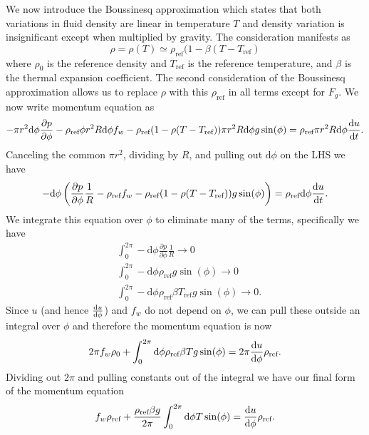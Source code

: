 \documentclass[12pt]{report}
\newcommand{\pdiff}[2]{\frac{\partial #1}{\partial #2}}
\newcommand{\diff}[2]{\frac{{\rm d}#1}{{\rm d}#2}}
\newcommand{\rhoref}{\rho_{\text{ref}}}
\newcommand{\dphi}{\text{d}\phi}
\begin{document}
We now introduce the Boussinesq approximation which states that both variations in fluid density are linear in temperature $T$ and density variation is insignificant except when multiplied by gravity.
The consideration manifests as
\begin{equation*} \rho = \rho (T) \simeq \rho _\text{ref} (1 - \beta (T - T_\text{ref}) \end{equation*}
where $\rho _0$ is the reference density and $T_\text{ref}$ is the reference temperature, and $\beta$ is the thermal expansion coefficient.
The second consideration of the Boussinesq approximation allows us to replace $\rho$ with this $\rhoref$ in all terms except for $F_g$.
We now write momentum equation as
\begin{equation} -\pi r^2 \dphi \pdiff{p}{\phi} - \rhoref \phi r^2 R \dphi f_w
- \rhoref (1 - \rho (T- T_\text{ref}) ) \pi r^2 R \dphi g \sin (\phi) = \rhoref \pi r^2 R \dphi \diff{u}{t}. \end{equation}
Canceling the common $\pi r^2$, dividing by $R$, and pulling out $\dphi$ on the LHS we have
\begin{equation} -\dphi \left ( \pdiff{p}{\phi}  \frac{1}{R} - \rhoref f_w - \rhoref (1 - \rho (T- T_\text{ref}) ) g \sin (\phi) \right ) = \rhoref \dphi \diff{u}{t}. \label{eq:EM07} \end{equation}
We integrate this equation over $\phi$ to eliminate many of the terms, specifically we have
\begin{align*}
& \int _{0} ^{2\pi} -\dphi \pdiff{p}{\phi} \frac{1}{R} \rightarrow 0\\
& \int _{0} ^{2\pi} -\dphi \rhoref g \sin (\phi) \rightarrow 0\\
& \int _{0} ^{2\pi} -\dphi \rhoref \beta T_\text{ref} g \sin (\phi) \rightarrow 0.\end{align*}
Since $u$ (and hence $\diff{u}{\phi}$) and $f_w$ do not depend on $\phi$, we can pull these outside an integral over $\phi$ and therefore the momentum equation is now 
\begin{equation*} 2\pi f_w \rho _0 + \int _{0} ^{2\pi} \dphi \rhoref \beta T g \sin (\phi) = 2\pi \diff{u}{\phi} \rhoref .\end{equation*}
Dividing out $2\pi$ and pulling constants out of the integral we have our final form of the momentum equation
\begin{equation} f_w \rhoref + \frac{\rhoref \beta g }{2 \pi} \int _{0} ^{2\pi} \dphi T \sin (\phi) = \diff{u}{\phi} \rhoref \label{eq:EM10}.\end{equation}
\end{document}
